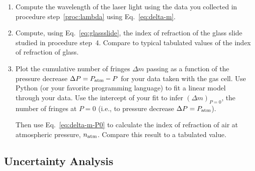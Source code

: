 \begin{enumerate}
\item Compute the wavelength of the laser light using the data you collected in
  procedure step~\ref{proc:lambda} using Eq.~\ref{eq:delta-m}.

\item Compute, using Eq.~\ref{eq:glassslide}, the index of refraction of the
  glass slide studied in procedure step~4. Compare to typical tabulated values
  of the index of refraction of glass.

\item Plot the cumulative number of fringes $\Delta m$ passing 
as a function of the pressure decrease $\Delta P = P_{\rm atm} - 
P$ for your data taken with the gas cell. Use Python (or your favorite
programming language) to fit a linear model through your data.
Use the intercept of your fit to infer $(\Delta m)_{P=0}$, the number of fringes
at $P=0$ (i.e., to pressure decrease $\Delta P = P_{\rm atm}$). 

Then use Eq.~\ref{eq:delta-m-P0} to calculate the index of refraction of air 
at atmospheric pressure, $n_{\rm atm}$. Compare this result to a tabulated 
value.

\end{enumerate}

\subsection{Uncertainty Analysis}


